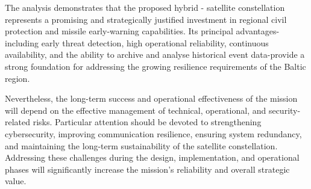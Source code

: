 The  analysis demonstrates that the proposed hybrid - satellite constellation represents a promising and strategically justified investment in regional civil protection and missile early-warning capabilities. Its principal advantages-including early threat detection, high operational reliability, continuous availability, and the ability to archive and analyse historical event data-provide a strong foundation for addressing the growing resilience requirements of the Baltic region.

Nevertheless, the long-term success and operational effectiveness of the  mission will depend on the effective management of technical, operational, and security-related risks. Particular attention should be devoted to strengthening cybersecurity, improving communication resilience, ensuring system redundancy, and maintaining the long-term sustainability of the satellite constellation. Addressing these challenges during the design, implementation, and operational phases will significantly increase the mission's reliability and overall strategic value.